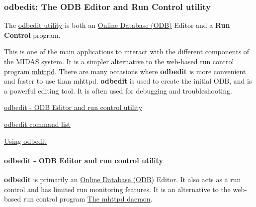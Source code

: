 \subsubsection{odbedit: The ODB Editor and Run Control utility}\label{RC_odbedit}
\par
 

\par


The \hyperlink{RC_odbedit_utility}{odbedit utility} is both an \hyperlink{F_MainElements_F_Online_Database_overview}{Online Database (ODB)} Editor and a {\bfseries Run Control} program. \par
 This is one of the main applications to interact with the different components of the MIDAS system. It is a simpler alternative to the web-\/based run control program \hyperlink{RC_mhttpd_utility}{mhttpd}. There are many occasions where {\bfseries odbedit} is more convenient and faster to use than mhttpd. {\bfseries odbedit} is used to create the initial ODB, and is a powerful editing tool. It is often used for debugging and troubleshooting. \par



\begin{DoxyItemize}
\item \hyperlink{RC_odbedit_utility}{odbedit -\/ ODB Editor and run control utility}
\item \hyperlink{RC_odbedit_utility_RC_odbedit_help}{odbedit command list}
\item \hyperlink{RC_odbedit_examples}{Using odbedit}
\end{DoxyItemize}

\par
 

\par
 \label{index_end}
\hypertarget{index_end}{}
 \paragraph{odbedit -\/ ODB Editor and run control utility}\label{RC_odbedit_utility}
\label{RC_odbedit_utility_idx_odbedit-utility}
\hypertarget{RC_odbedit_utility_idx_odbedit-utility}{}
 \par
 

\par


\label{RC_odbedit_utility_idx_edit_ODB_using-odbedit}
\hypertarget{RC_odbedit_utility_idx_edit_ODB_using-odbedit}{}
 {\bfseries odbedit} is primarily an \hyperlink{F_MainElements_F_Online_Database_overview}{Online Database (ODB)} Editor. It also acts as a run control and has limited run monitoring features. It is an alternative to the web-\/based run control program \hyperlink{RC_mhttpd_utility}{The mhttpd daemon}.


